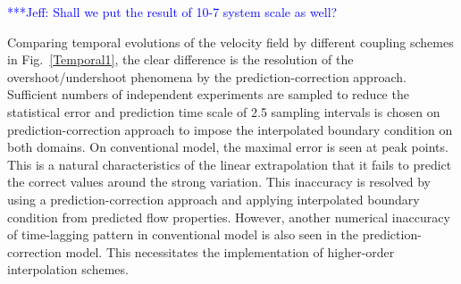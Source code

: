 \documentclass[preprint,12pt]{elsarticle}
\newcommand{\skonote}[1]{ {\textcolor{blue} { ***Jeff: #1 }}}
\newcommand{\skonote}[1]{}
\begin{document}
\skonote{Shall we put the result of 10-7 system scale as well?}


Comparing temporal evolutions of the velocity field by different coupling schemes in Fig.~\ref{Temporal1}, the clear difference is the resolution of the overshoot/undershoot phenomena by the prediction-correction approach. Sufficient numbers of independent experiments are sampled to reduce the statistical error and prediction time scale of 2.5 sampling intervals is chosen on prediction-correction approach to impose the interpolated boundary condition on both domains. On conventional model, the maximal error is seen at peak points. This is a natural characteristics of the linear extrapolation that it fails to predict the correct values around the strong variation. This inaccuracy is resolved by using a prediction-correction approach and applying interpolated boundary condition from predicted flow properties. However, another numerical inaccuracy of time-lagging pattern in conventional model is also seen in the prediction-correction model. This necessitates the implementation of higher-order interpolation schemes.
\end{document}

